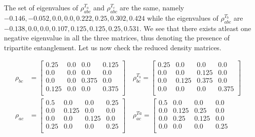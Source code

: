 \documentclass{scrartcl}
\begin{document}
        The set of eigenvalues of $\rho^{T_a}_{abc}$ and $\rho^{T_c}_{abc}$ are the same, namely $\mathbf{-0.146}, \mathbf{-0.052}, 0.0, 0.0, 0.222, 0.25, 0.302, 0.424$ while the eigenvalues of $\rho^{T_b}_{abc}$ are $\mathbf{-0.138}, 0.0, 0.0, 0.107, 0.125, 0.125, 0.25, 0.531$. We see that there exists atleast one negative eigenvalue in all the three matrices, thus denoting the presence of tripartite entanglement. Let us now check the reduced density matrices. 

        \begin{align*}
            \rho_{bc} &=
            \left[
            \begin{array}{cccc}
            0.25 & 0.0 & 0.0 & 0.125 \\
            0.0 & 0.0 & 0.0 & 0.0 \\
            0.0 & 0.0 & 0.375 & 0.0 \\
            0.125 & 0.0 & 0.0 & 0.375 \\
            \end{array}
            \right]\quad \rho_{bc}^{T_b} = 
            \left[
                \begin{array}{cccc}
                0.25 & 0.0 & 0.0 & 0.0 \\
                0.0 & 0.0 & 0.125 & 0.0 \\
                0.0 & 0.125 & 0.375 & 0.0 \\
                0.0 & 0.0 & 0.0 & 0.375 \\
                \end{array}
                \right]
                \\
            \rho_{ac} &=
            \left[
            \begin{array}{cccc}
            0.5 & 0.0 & 0.0 & 0.25 \\
            0.0 & 0.125 & 0.0 & 0.0 \\
            0.0 & 0.0 & 0.125 & 0.0 \\
            0.25 & 0.0 & 0.0 & 0.25 \\
            \end{array}
            \right]\quad \rho_{ac}^{Ta}= \left[
                \begin{array}{cccc}
                0.5 & 0.0 & 0.0 & 0.0 \\
                0.0 & 0.125 & 0.25 & 0.0 \\
                0.0 & 0.25 & 0.125 & 0.0 \\
                0.0 & 0.0 & 0.0 & 0.25 \\

\end{array}
\end{align*}
\end{document}
